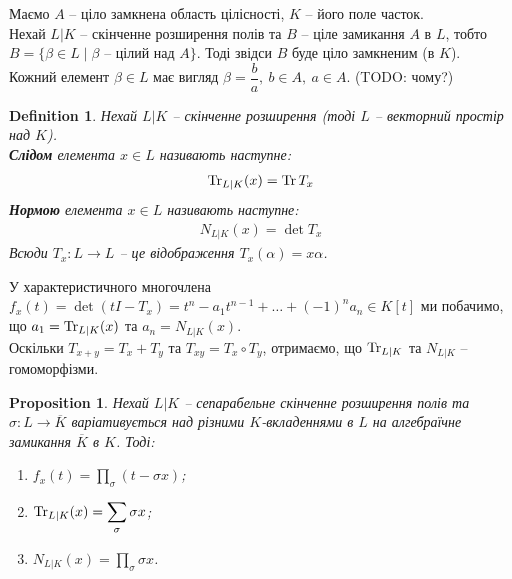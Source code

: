 \documentclass[a4paper, 10pt]{article}
\theoremstyle{theoremdd}
\theoremstyle{theoremdd}
\newtheorem{definition}[theorem]{Definition}
\theoremstyle{theoremdd}
\theoremstyle{theoremdd}
\theoremstyle{theoremdd}
\theoremstyle{theoremdd}
\theoremstyle{theoremdd}
\theoremstyle{theoremdd}
\theoremstyle{theoremdd}
\newtheorem{proposition}[theorem]{Proposition}
\theoremstyle{theoremdd}
\theoremstyle{theoremdd}
\theoremstyle{theoremdd}
\theoremstyle{theoremdd}
\theoremstyle{theoremdd}
\theoremstyle{theoremdd}
\begin{document}
Маємо $A$ -- ціло замкнена область цілісності, $K$ -- його поле часток.\\
Нехай $L|K$ -- скінченне розширення полів та $B$ -- ціле замикання $A$ в $L$, тобто $B = \{\beta \in L \mid \beta \text{ -- цілий над }A\}$. Тоді звідси $B$ буде ціло замкненим (в $K$).\\
Кожний елемент $\beta \in L$ має вигляд $\beta = \dfrac{b}{a},\ b \in A,\ a \in A$. (TODO: чому?)

\begin{definition}
Нехай $L|K$ -- скінченне розширення (тоді $L$ -- векторний простір над $K$).\\
\textbf{Слідом} елемента $x \in L$ називають наступне:
\begin{align*}
\Tr_{L|K}(x) = \Tr T_x
\end{align*}
\textbf{Нормою} елемента $x \in L$ називають наступне:
\begin{align*}
N_{L|K}(x) = \det T_x
\end{align*}
Всюди $T_x \colon L \to L$ -- це відображення $T_x(\alpha) = x \alpha$.
\end{definition}

У характеристичного многочлена $f_x(t) = \det (t I - T_x) = t^n - a_1 t^{n-1} + \dots + (-1)^n a_n \in K[t]$ ми побачимо, що $a_1 = \Tr_{L|K}(x)$ та $a_n = N_{L|K}(x)$.\\
Оскільки $T_{x+y} = T_x + T_y$ та $T_{xy} = T_x \circ T_y$, отримаємо, що $\Tr_{L|K}$ та $N_{L|K}$ -- гомоморфізми.

\begin{proposition}
Нехай $L|K$ -- сепарабельне скінченне розширення полів та $\sigma \colon L \to \overline{K}$ варіативується над різними $K$-вкладеннями в $L$ на алгебраїчне замикання $\overline{K}$ в $K$. Тоді:
\begin{enumerate}[nosep,wide=0pt,label={\arabic*)}]
\item $f_x(t) = \displaystyle\prod_{\sigma} (t-\sigma x)$;
\item $\Tr_{L|K}(x) = \displaystyle\sum_\sigma \sigma x$;
\item $N_{L|K}(x) = \displaystyle\prod_{\sigma} \sigma x$.
\end{enumerate}
\end{proposition}
\end{document}
